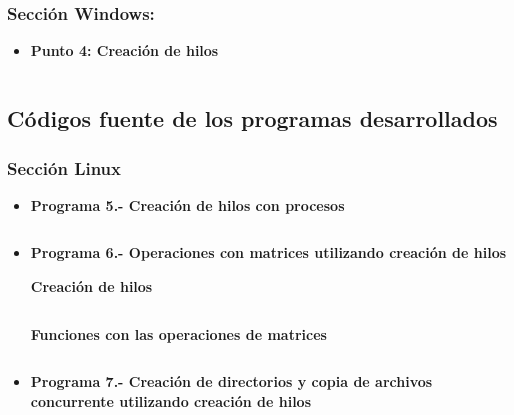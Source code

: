 \documentclass[12pt]{article}
\begin{document}
        
            
        \subsubsection{Sección Windows:}
        \begin{itemize}
            \item[\Checkmark] \textbf{Punto 4: Creación de hilos} 
            \inputminted{c++}{Code/Windows/4.c}
        \end{itemize}

    		
       

    	\subsection{Códigos fuente de los programas desarrollados}
    	
    	\subsubsection{Sección Linux}

    	\begin{itemize}
    	    \item[\Checkmark] \textbf{Programa 5.- Creación de hilos con procesos}
    	        \inputminted{c++}{Code/Linux/5.c}
    	        
    	    \item[\Checkmark] \textbf{Programa 6.- Operaciones con matrices utilizando creación de hilos}
    	    
    	    \textbf{Creación de hilos}
    	    
    	        \inputminted{c++}{Code/Linux/6.c}
    	        
    	    \textbf{Funciones con las operaciones de matrices}
    	    
    	        \inputminted{c++}{Code/Linux/funciones.h}
    	        
    	    \item[\Checkmark] \textbf{Programa 7.- Creación de directorios y copia de archivos concurrente utilizando creación de hilos}
    	        \inputminted{c++}{Code/Linux/7.c}

    	
    	\end{itemize}
    	
\end{document}
